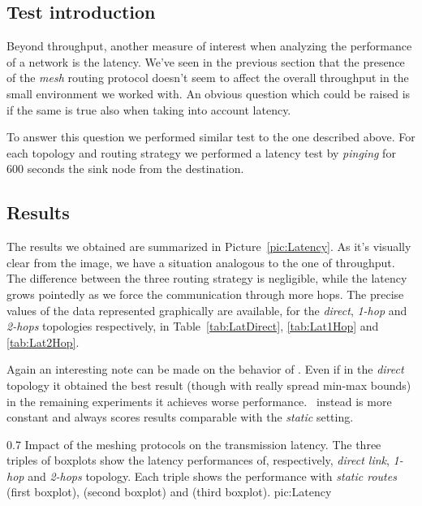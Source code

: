 \subsection{Test introduction}
    Beyond throughput, another measure of interest when analyzing the
    performance of a network is the latency. We've seen in the
    previous section that the presence of the \emph{mesh} routing
    protocol doesn't seem to affect the overall throughput in the small
    environment we worked with. An obvious question which could be
    raised is if the same is true also when taking into account latency.

    To answer this question we performed similar test to the one
    described above. For each topology and routing strategy we
    performed a latency test by \emph{pinging} for 600 seconds the sink
    node from the destination.

\subsection{Results}

    The results we obtained are summarized in
    Picture~\ref{pic:Latency}. As it's visually clear from the image, we
    have a situation analogous to the one of throughput. The difference
    between the three routing strategy is negligible, while the latency
    grows pointedly as we force the communication through more hops.
    The precise values of the data represented graphically are available,
    for the \emph{direct}, \emph{1-hop} and \emph{2-hops} topologies
    respectively, in Table~\ref{tab:LatDirect}, \ref{tab:Lat1Hop} and
    \ref{tab:Lat2Hop}.

    Again an interesting note can be made on the behavior of \olsr. Even
    if in the \emph{direct} topology it obtained the best result (though
    with really spread min-max bounds) in the remaining experiments it
    achieves worse performance. \batman\ instead is more constant and
    always scores results comparable with the \emph{static} setting.

        {0.7 \columnwidth}
        {Impact of the meshing protocols on the transmission latency. The
         three triples of boxplots show the latency performances of,
         respectively, \emph{direct link}, \emph{1-hop} and \emph{2-hops}
         topology. Each triple shows the performance with \emph{static
         routes} (first boxplot), \emph{\batman} (second boxplot) and
         \emph{\olsr} (third boxplot).}
        {pic:Latency}

